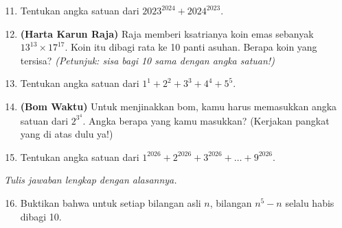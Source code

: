 \documentclass[11pt,a4paper]{article}
\begin{document}
\begin{enumerate}
    \setcounter{enumi}{10}
    \item Tentukan angka satuan dari $2023^{2024} + 2024^{2023}$.
    \item \textbf{(Harta Karun Raja)} Raja memberi ksatrianya koin emas sebanyak
          $13^{13} \times 17^{17}$. Koin itu dibagi rata ke 10 panti asuhan. Berapa koin yang
          tersisa? \textit{(Petunjuk: sisa bagi 10 sama dengan angka satuan!)}
    \item Tentukan angka satuan dari $1^1 + 2^2 + 3^3 + 4^4 + 5^5$.
    \item \textbf{(Bom Waktu)} Untuk menjinakkan bom, kamu harus memasukkan angka satuan dari
          $2^{3^4}$. Angka berapa yang kamu masukkan? (Kerjakan pangkat yang di atas dulu ya!)
    \item Tentukan angka satuan dari $1^{2026} + 2^{2026} + 3^{2026} + \dots + 9^{2026}$.
\end{enumerate}

\textit{Tulis jawaban lengkap dengan alasannya.}
\begin{enumerate}
    \setcounter{enumi}{15}
    \item Buktikan bahwa untuk setiap bilangan asli $n$, bilangan $n^5 - n$ selalu habis
          dibagi 10.
\end{enumerate}
\end{document}
